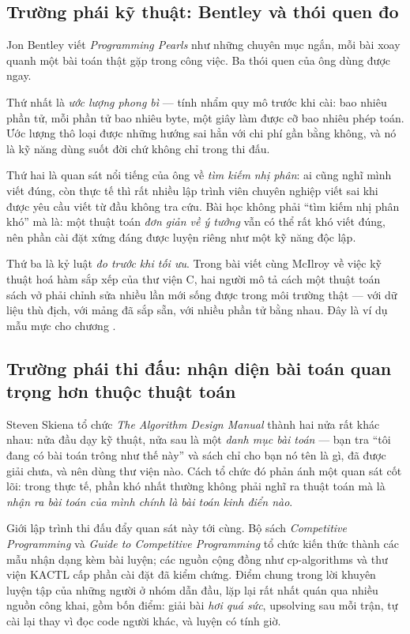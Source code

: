 \documentclass[../../algorithm.tex]{subfiles}
\begin{document}
\subsection{Trường phái kỹ thuật: Bentley và thói quen đo}

Jon Bentley viết \emph{Programming Pearls}\cite{bentley2000} như những chuyên mục ngắn, mỗi bài xoay quanh một bài toán thật gặp trong công việc. Ba thói quen của ông dùng được ngay.

Thứ nhất là \emph{ước lượng phong bì} --- tính nhẩm quy mô trước khi cài: bao nhiêu phần tử, mỗi phần tử bao nhiêu byte, một giây làm được cỡ bao nhiêu phép toán. Ước lượng thô loại được những hướng sai hẳn với chi phí gần bằng không, và nó là kỹ năng dùng suốt đời chứ không chỉ trong thi đấu.

Thứ hai là quan sát nổi tiếng của ông về \emph{tìm kiếm nhị phân}: ai cũng nghĩ mình viết đúng, còn thực tế thì rất nhiều lập trình viên chuyên nghiệp viết sai khi được yêu cầu viết từ đầu không tra cứu. Bài học không phải ``tìm kiếm nhị phân khó'' mà là: một thuật toán \emph{đơn giản về ý tưởng} vẫn có thể rất khó viết đúng, nên phần cài đặt xứng đáng được luyện riêng như một kỹ năng độc lập.

Thứ ba là kỷ luật \emph{đo trước khi tối ưu}. Trong bài viết cùng McIlroy về việc kỹ thuật hoá hàm sắp xếp của thư viện C\cite{bentley1993sort}, hai người mô tả cách một thuật toán sách vở phải chỉnh sửa nhiều lần mới sống được trong môi trường thật --- với dữ liệu thù địch, với mảng đã sắp sẵn, với nhiều phần tử bằng nhau. Đây là ví dụ mẫu mực cho chương .

\subsection{Trường phái thi đấu: nhận diện bài toán quan trọng hơn thuộc thuật toán}

Steven Skiena tổ chức \emph{The Algorithm Design Manual}\cite{skiena2020} thành hai nửa rất khác nhau: nửa đầu dạy kỹ thuật, nửa sau là một \emph{danh mục bài toán} --- bạn tra ``tôi đang có bài toán trông như thế này'' và sách chỉ cho bạn nó tên là gì, đã được giải chưa, và nên dùng thư viện nào. Cách tổ chức đó phản ánh một quan sát cốt lõi: trong thực tế, phần khó nhất thường không phải nghĩ ra thuật toán mà là \emph{nhận ra bài toán của mình chính là bài toán kinh điển nào}.

Giới lập trình thi đấu đẩy quan sát này tới cùng. Bộ sách \emph{Competitive Programming}\cite{halim2020} và \emph{Guide to Competitive Programming}\cite{laaksonen2017} tổ chức kiến thức thành các mẫu nhận dạng kèm bài luyện; các nguồn cộng đồng như cp-algorithms\cite{cpalgorithms} và thư viện KACTL\cite{kactl} cấp phần cài đặt đã kiểm chứng. Điểm chung trong lời khuyên luyện tập của những người ở nhóm dẫn đầu, lặp lại rất nhất quán qua nhiều nguồn công khai, gồm bốn điểm: giải bài \emph{hơi quá sức}, upsolving sau mỗi trận, tự cài lại thay vì đọc code người khác, và luyện có tính giờ.
\end{document}
